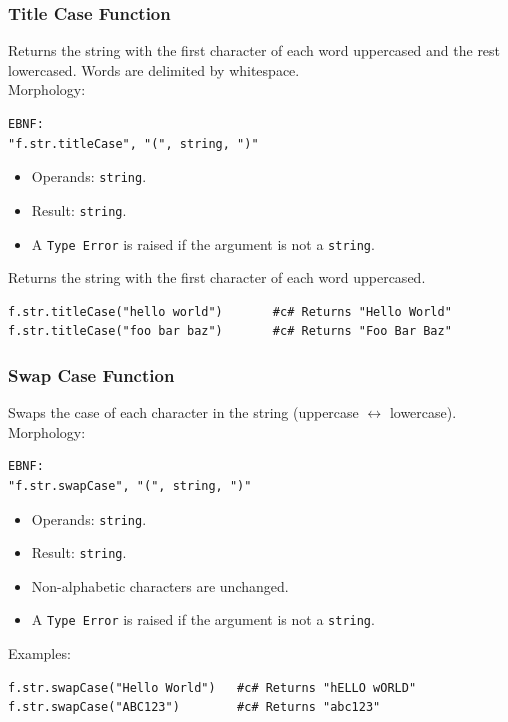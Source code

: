 \subsubsection{Title Case Function}
Returns the string with the first character of each word uppercased and the rest lowercased. Words are delimited by whitespace. \\
Morphology:
\begin{verbatim}
EBNF:
"f.str.titleCase", "(", string, ")"
\end{verbatim}
\begin{itemize}
\item Operands: \texttt{string}.
\item Result: \texttt{string}.
\item A \texttt{Type Error} is raised if the argument is not a \texttt{string}.
\end{itemize}
Returns the string with the first character of each word uppercased.
\begin{verbatim}
f.str.titleCase("hello world")       #c# Returns "Hello World"
f.str.titleCase("foo bar baz")       #c# Returns "Foo Bar Baz"
\end{verbatim}

\subsubsection{Swap Case Function}
Swaps the case of each character in the string (uppercase $\leftrightarrow$ lowercase). \\
Morphology:
\begin{verbatim}
EBNF:
"f.str.swapCase", "(", string, ")"
\end{verbatim}
\begin{itemize}
\item Operands: \texttt{string}.
\item Result: \texttt{string}.
\item Non-alphabetic characters are unchanged.
\item A \texttt{Type Error} is raised if the argument is not a \texttt{string}.
\end{itemize}
Examples:
\begin{verbatim}
f.str.swapCase("Hello World")   #c# Returns "hELLO wORLD"
f.str.swapCase("ABC123")        #c# Returns "abc123"
\end{verbatim}


